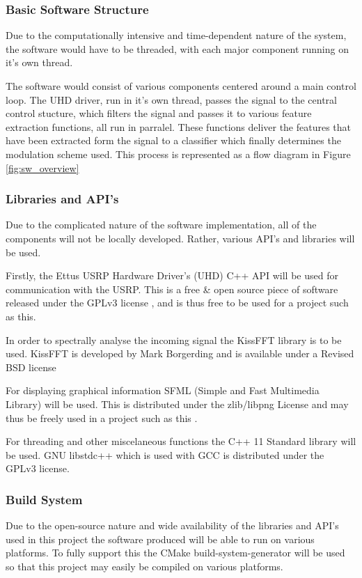 \documentclass[10pt,twocolumn]{witseiepaper}
\begin{document}
		\subsubsection{Basic Software Structure}
			Due to the computationally intensive and time-dependent nature of the system, the software would have to be threaded, with each major component running on it's own thread.

			The software would consist of various components centered around a main control loop. The UHD driver, run in it's own thread, passes the signal to the central control stucture, which filters the signal and passes it to various feature extraction functions, all run in parralel. These functions deliver the features that have been extracted form the signal to a classifier which finally determines the modulation scheme used. This process is represented as a flow diagram in Figure \ref{fig:sw_overview}
		\subsubsection{Libraries and API's}
			Due to the complicated nature of the software implementation, all of the components will not be locally developed. Rather, various API's and libraries will be used.

			Firstly, the Ettus USRP Hardware Driver's (UHD) C++ API will be used for communication with the USRP. This is a free \& open source piece of software released under the GPLv3 license \cite{uhd_license}, and is thus free to be used for a project such as this.

			In order to spectrally analyse the incoming signal the KissFFT library is to be used. KissFFT is developed by Mark Borgerding and is available under a Revised BSD license \cite{kissfft_license}

			For displaying graphical information SFML (Simple and Fast Multimedia Library) will be used. This is distributed under the zlib/libpng License and may thus be freely used in a project such as this \cite{sfml_license}.

			For threading and other miscelaneous functions the C++ 11 Standard library will be used. GNU libstdc++ which is used with GCC is distributed under the GPLv3 license.

		\subsubsection{Build System}
			Due to the open-source nature and wide availability of the libraries and API's used in this project the software produced will be able to run on various platforms. To fully support this the CMake build-system-generator will be used so that this project may easily be compiled on various platforms.
\end{document}
